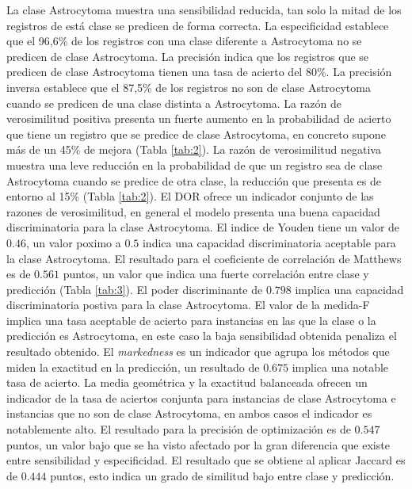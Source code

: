 La clase Astrocytoma muestra una sensibilidad reducida, tan solo la mitad de los registros de está clase se predicen de forma correcta. La especificidad establece que el 96,6\% de los registros con una clase diferente a Astrocytoma no se predicen de clase Astrocytoma. La precisión indica que los registros que se predicen de clase Astrocytoma tienen una tasa de acierto del 80\%. La precisión inversa establece que el 87,5\% de los registros no son de clase Astrocytoma cuando se predicen de una clase distinta a Astrocytoma. La razón de verosimilitud positiva presenta un fuerte aumento en la probabilidad de acierto que tiene un registro que se predice de clase Astrocytoma, en concreto supone más de un 45\% de mejora (Tabla \ref{tab:2}). La razón de verosimilitud negativa muestra una leve reducción en la probabilidad de que un registro sea de clase Astrocytoma cuando se predice de otra clase, la reducción que presenta es de entorno al 15\% (Tabla \ref{tab:2}). El DOR ofrece un indicador conjunto de las razones de verosimilitud, en general el modelo presenta una buena capacidad discriminatoria para la clase Astrocytoma. El indice de Youden tiene un valor de $0.46$, un valor poximo a $0.5$ indica una capacidad discriminatoria aceptable para la clase Astrocytoma. El resultado para el coeficiente de correlación de Matthews es de $0.561$ puntos, un valor que indica una fuerte correlación entre clase y predicción (Tabla \ref{tab:3}). El poder discriminante de $0.798$ implica una capacidad discriminatoria postiva para la clase Astrocytoma. El valor de la medida-F implica una tasa aceptable de acierto para instancias en las que la clase o la predicción es Astrocytoma, en este caso la baja sensibilidad obtenida penaliza el resultado obtenido. El \textit{markedness} es un indicador que agrupa los métodos que miden la exactitud en la predicción, un resultado de $0.675$ implica una notable tasa de acierto. La media geométrica y la exactitud balanceada ofrecen un indicador de la tasa de aciertos conjunta para instancias de clase Astrocytoma e instancias que no son de clase Astrocytoma, en ambos casos el indicador es notablemente alto. El resultado para la precisión de optimización es de $0.547$ puntos, un valor bajo que se ha visto afectado por la gran diferencia que existe entre sensibilidad y especificidad. El resultado que se obtiene al aplicar Jaccard es de $0.444$ puntos, esto indica un grado de similitud bajo entre clase y predicción.

\bigbreak


